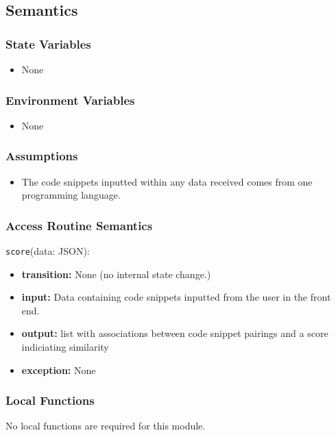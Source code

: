\documentclass[12pt, titlepage]{article}
\begin{document}
\begin{itemize}
\subsection{Semantics}

\subsubsection{State Variables}

\begin{itemize}
    \item None
\end{itemize}

\subsubsection{Environment Variables}

\begin{itemize}
  \item None
\end{itemize}

\subsubsection{Assumptions}

\begin{itemize}
    \item The code snippets inputted within any data received comes from one programming language.
\end{itemize}

\subsubsection{Access Routine Semantics}
\noindent \texttt{score}(data: JSON):
\begin{itemize}
    \item \textbf{transition:} None (no internal state change.)
    \item \textbf{input:} Data containing code snippets inputted from the user in the front end.
    \item \textbf{output:} list with associations between code snippet pairings and a score indiciating
    similarity
    \item \textbf{exception:} None
\end{itemize}

\subsubsection{Local Functions}
No local functions are required for this module.



\end{itemize}
\end{document}
